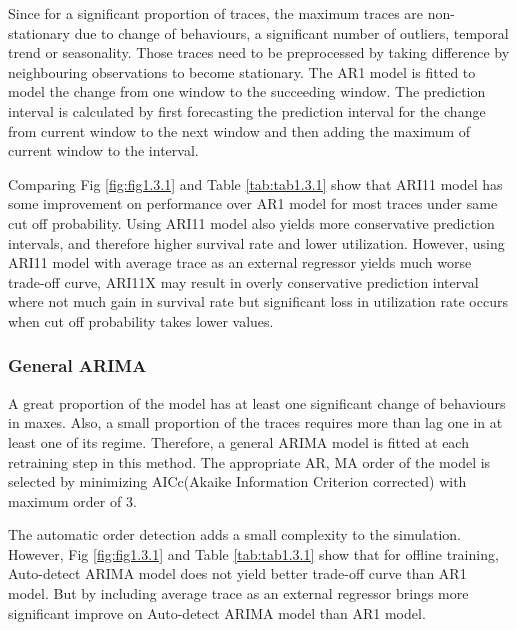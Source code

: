 \documentclass{article}
\begin{document}
\begin{flushleft}
Since for a significant proportion of traces, the maximum traces are non-stationary due to change of behaviours, a significant number of outliers, temporal trend or seasonality. Those traces need to be preprocessed by taking difference by neighbouring observations to become stationary. The AR1 model is fitted to model the change from one window to the succeeding window. The prediction interval is calculated by first forecasting the prediction interval for the change from current window to the next window and then adding the maximum of current window to the interval.

Comparing Fig \ref{fig:fig1.3.1} and Table \ref{tab:tab1.3.1} show that ARI11 model has some improvement on performance over AR1 model for most traces under same cut off probability. Using ARI11 model also yields more conservative prediction intervals, and therefore higher survival rate and lower utilization. However, using ARI11 model with average trace as an external regressor yields much worse trade-off curve, ARI11X may result in overly conservative prediction interval where not much gain in survival rate but significant loss in utilization rate occurs when cut off probability takes lower values.
\end{flushleft}

\subsubsection{General ARIMA}

\begin{flushleft}
A great proportion of the model has at least one significant change of behaviours in maxes. Also, a small proportion of the traces requires more than lag one in at least one of its regime. Therefore, a general ARIMA model is fitted at each retraining step in this method. The appropriate AR, MA order of the model is selected by minimizing AICc(Akaike Information Criterion corrected) with maximum order of 3. 

The automatic order detection adds a small complexity to the simulation. However, Fig \ref{fig:fig1.3.1} and Table \ref{tab:tab1.3.1} show that for offline training, Auto-detect ARIMA model does not yield better trade-off curve than AR1 model. But by including average trace as an external regressor brings more significant improve on Auto-detect ARIMA model than AR1 model.
\end{flushleft}
\end{document}
